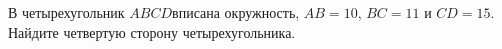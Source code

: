 \begin{ex}
	\begin{condition}
		В четырехугольник \(ABCD\)вписана окружность, \(AB=10\), \( BC=11\) и \( CD=15 \). Найдите четвертую сторону четырехугольника.
	\end{condition}
\end{ex}